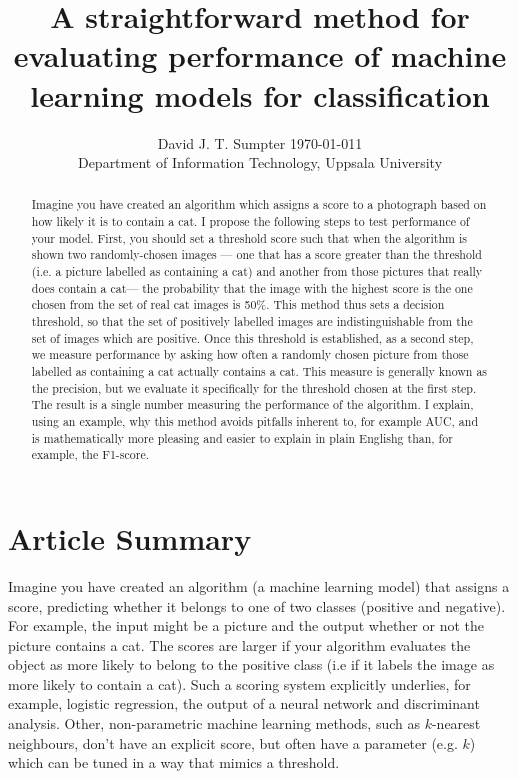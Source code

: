 \documentclass{article}
\title{A straightforward method for evaluating performance of machine learning models for classification}
\author{David J. T. Sumpter
  \today1\\
  Department of Information Technology, Uppsala University\\
}
\begin{document}

\maketitle

\begin{abstract}
Imagine you have created an algorithm which assigns a score to a photograph based on how likely it is to contain a cat.  I propose the following steps to test performance of your model. First, you should set a threshold score such that when the algorithm is shown two randomly-chosen images --- one that has a score greater than the threshold (i.e. a picture labelled as containing a cat) and another from those pictures that really does contain a cat--- the probability that the image with the highest score is the one chosen from the set of real cat images is 50\%. This method thus sets a decision threshold, so that the set of positively labelled images are indistinguishable from the set of images which are positive. Once this threshold is established, as a second step, we measure performance by asking how often a randomly chosen picture from those labelled as containing a cat actually contains a cat. This measure is generally known as the precision, but we evaluate it specifically for the threshold chosen at the first step. The result is a single number measuring the performance of the algorithm. I explain, using an example, why this method avoids pitfalls inherent to, for example AUC, and is mathematically more pleasing and easier to explain in plain Englishg than, for example, the F1-score.
\end{abstract}

\section{Article Summary}

Imagine you have created an algorithm (a machine learning model) that assigns a score, predicting whether it belongs to one of two classes (positive and negative). For example, the input might be a picture and the output whether or not the picture contains a cat. The scores are larger if your algorithm evaluates the object as more likely to belong to the positive class (i.e if it labels the image as more likely to contain a cat). Such a scoring system explicitly underlies, for example, logistic regression, the output of a neural network and discriminant analysis. Other, non-parametric machine learning methods, such as $k$-nearest neighbours, don't have an explicit score, but often have a parameter (e.g. $k$) which can be tuned in a way that mimics a threshold. 
\end{document}

